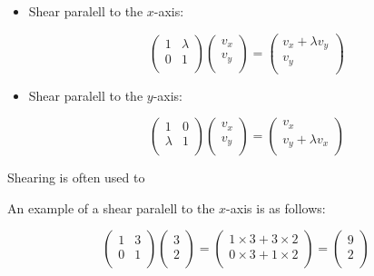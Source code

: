 \documentclass[a4paper,oneside]{report}
\begin{document}
\begin{itemize}
	\item{Shear paralell to the \( x \)-axis:

		\[ \begin{pmatrix}
			1 & \lambda \\
			0 & 1 \\
		\end{pmatrix} \begin{pmatrix}
			v_x \\
			v_y \\
		\end{pmatrix} = \begin{pmatrix}
			v_x + \lambda v_y \\
			v_y \\
		\end{pmatrix} \]
		}
	\item{Shear paralell to the \( y \)-axis:

		\[ \begin{pmatrix}
			1 & 0 \\
			\lambda & 1 \\
		\end{pmatrix} \begin{pmatrix}
			v_x \\
			v_y \\
		\end{pmatrix} = \begin{pmatrix}
			v_x \\
			v_y + \lambda v_x \\
		\end{pmatrix} \]
		}
\end{itemize}

Shearing is often used to 

An example of a shear paralell to the \( x \)-axis is as follows:

\[ \begin{pmatrix}
	1 & 3 \\
	0 & 1 \\
\end{pmatrix} \begin{pmatrix}
	3 \\
	2 \\
\end{pmatrix} = \begin{pmatrix}
	1 \times 3 + 3 \times 2 \\
	0 \times 3 + 1 \times 2 \\
\end{pmatrix} = \begin{pmatrix}
	9 \\
	2 \\
\end{pmatrix} \]
\end{document}
